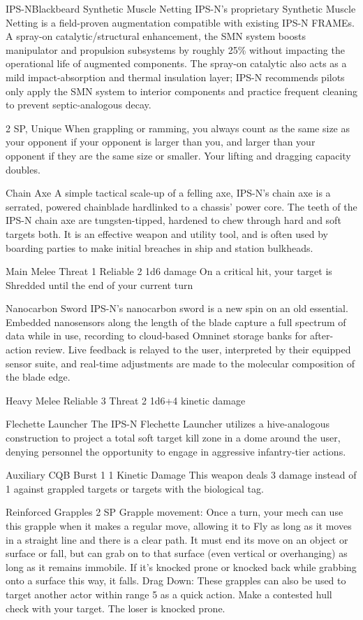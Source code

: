 \begin{mech}{IPS-N}{Blackbeard}
Synthetic Muscle Netting
IPS-N’s proprietary Synthetic Muscle Netting is a field-proven augmentation compatible with existing IPS-N FRAMEs. A spray-on catalytic/structural enhancement, the SMN system boosts manipulator and propulsion subsystems by roughly 25\% without impacting the operational life of augmented components. The spray-on catalytic also acts as a mild impact-absorption and thermal insulation layer; IPS-N recommends pilots only apply the SMN system to interior components and practice frequent cleaning to prevent septic-analogous decay.

2 SP, Unique
When grappling or ramming, you always count as the same size as your opponent if your opponent is larger than you, and larger than your opponent if they are the same size or smaller. Your lifting and dragging capacity doubles.

Chain Axe
A simple tactical scale-up of a felling axe, IPS-N’s chain axe is a serrated, powered chainblade hardlinked to a chassis’ power core. The teeth of the IPS-N chain axe are tungsten-tipped, hardened to chew through hard and soft targets both. It is an effective weapon and utility tool, and is often used by boarding parties to make initial breaches in ship and station bulkheads.

Main Melee
Threat 1
Reliable 2
1d6 damage
On a critical hit, your target is Shredded until the end of your current turn

Nanocarbon Sword
IPS-N’s nanocarbon sword is a new spin on an old essential. Embedded nanosensors along the length of the blade capture a full spectrum of data while in use, recording to cloud-based Omninet storage banks for after-action review. Live feedback is relayed to the user, interpreted by their equipped sensor suite, and real-time adjustments are made to the molecular composition of the blade edge.

Heavy Melee
Reliable 3
Threat 2
1d6+4 kinetic damage

Flechette Launcher
The IPS-N Flechette Launcher utilizes a hive-analogous construction to project a total soft target kill zone in a dome around the user, denying personnel the opportunity to engage in aggressive infantry-tier actions.

Auxiliary CQB
Burst 1
1 Kinetic Damage
This weapon deals 3 damage instead of 1 against grappled targets or targets with the biological tag.

Reinforced Grapples
2 SP
Grapple movement: Once a turn, your mech can use this grapple when it makes a regular move, allowing it to Fly as long as it moves in a straight line and there is a clear path. It must end its move on an object or surface or fall, but can grab on to that surface (even vertical or overhanging) as long as it remains immobile. If it’s knocked prone or knocked back while grabbing onto a surface this way, it falls.
Drag Down: These grapples can also be used to target another actor within range 5 as a quick action. Make a contested hull check with your target. The loser is knocked prone.


\end{mech}
